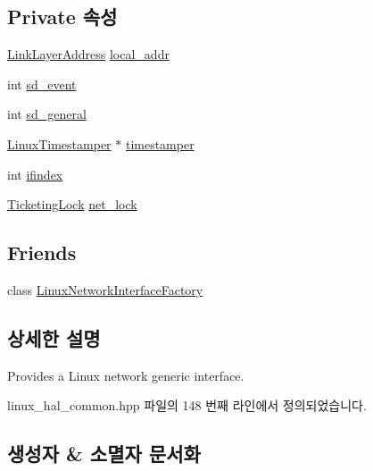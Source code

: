 \subsection*{Private 속성}
\begin{DoxyCompactItemize}
\item 
\hyperlink{class_link_layer_address}{Link\+Layer\+Address} \hyperlink{class_linux_network_interface_af3d1546f688fbb9cec0317d152cab1da}{local\+\_\+addr}
\item 
int \hyperlink{class_linux_network_interface_ab2e41169dafb40e1ab917422a2d1145a}{sd\+\_\+event}
\item 
int \hyperlink{class_linux_network_interface_a4dac986db2725a7381738a799374da65}{sd\+\_\+general}
\item 
\hyperlink{class_linux_timestamper}{Linux\+Timestamper} $\ast$ \hyperlink{class_linux_network_interface_a47975f2b80d6d5e6fc426813df74feeb}{timestamper}
\item 
int \hyperlink{class_linux_network_interface_a01e636f8746c84f1cf3d45c4afbfde35}{ifindex}
\item 
\hyperlink{class_ticketing_lock}{Ticketing\+Lock} \hyperlink{class_linux_network_interface_a2485d8ad81138164119a9e8b68642a1d}{net\+\_\+lock}
\end{DoxyCompactItemize}
\subsection*{Friends}
\begin{DoxyCompactItemize}
\item 
class \hyperlink{class_linux_network_interface_af1d8dc20f87a29eb0af128366c47a247}{Linux\+Network\+Interface\+Factory}
\end{DoxyCompactItemize}


\subsection{상세한 설명}
Provides a Linux network generic interface. 

linux\+\_\+hal\+\_\+common.\+hpp 파일의 148 번째 라인에서 정의되었습니다.



\subsection{생성자 \& 소멸자 문서화}
